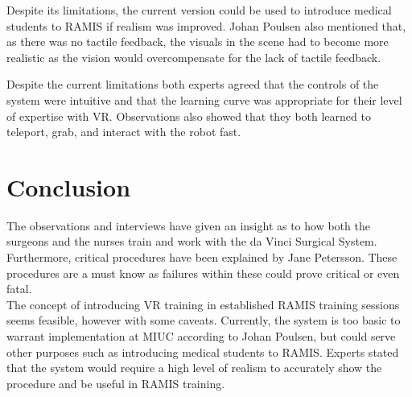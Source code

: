Despite its limitations, the current version could be used to introduce medical students to RAMIS if realism was improved. Johan Poulsen also mentioned that, as there was no tactile feedback, the visuals in the scene had to become more realistic as the vision would overcompensate for the lack of tactile feedback. 

Despite the current limitations both experts agreed that the controls of the system were intuitive and that the learning curve was appropriate for their level of expertise with VR. Observations also showed that they both learned to teleport, grab, and interact with the robot fast.


\section*{Conclusion}
The observations and interviews have given an insight as to how both the surgeons and the nurses train and work with the da Vinci Surgical System. Furthermore, critical procedures have been explained by Jane Petersson. These procedures are a must know as failures within these could prove critical or even fatal.\\

The concept of introducing VR training in established RAMIS training sessions seems feasible, however with some caveats. Currently, the system is too basic to warrant implementation at MIUC according to Johan Poulsen, but could serve other purposes such as introducing medical students to RAMIS. Experts stated that the system would require a high level of realism to accurately show the procedure and be useful in RAMIS training.




\newpage
\appendix
%